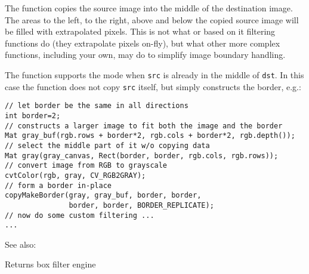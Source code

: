 The function copies the source image into the middle of the destination image. The areas to the left, to the right, above and below the copied source image will be filled with extrapolated pixels. This is not what  or based on it filtering functions do (they extrapolate pixels on-fly), but what other more complex functions, including your own, may do to simplify image boundary handling.

The function supports the mode when \texttt{src} is already in the middle of \texttt{dst}. In this case the function does not copy \texttt{src} itself, but simply constructs the border, e.g.:

\begin{lstlisting}
// let border be the same in all directions
int border=2;
// constructs a larger image to fit both the image and the border
Mat gray_buf(rgb.rows + border*2, rgb.cols + border*2, rgb.depth());
// select the middle part of it w/o copying data
Mat gray(gray_canvas, Rect(border, border, rgb.cols, rgb.rows));
// convert image from RGB to grayscale
cvtColor(rgb, gray, CV_RGB2GRAY);
// form a border in-place
copyMakeBorder(gray, gray_buf, border, border,
               border, border, BORDER_REPLICATE);
// now do some custom filtering ...
...
\end{lstlisting}

See also: 

Returns box filter engine

\begin{description}
\end{description}

